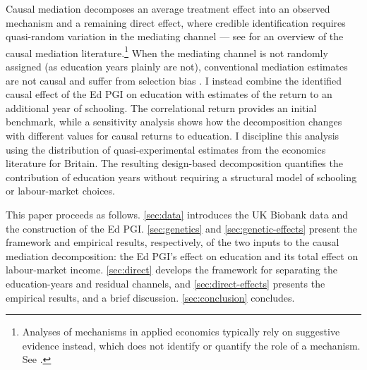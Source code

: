 Causal mediation decomposes an average treatment effect into an observed mechanism and a remaining direct effect, where credible identification requires quasi-random variation in the mediating channel \citep{imai2010identification} --- see \cite{huber2019review} for an overview of the causal mediation literature.\footnote{
    Analyses of mechanisms in applied economics typically rely on suggestive evidence instead, which does not identify or quantify the role of a mechanism.
    See \cite{blackwell2024assumption,green2010enough}.
}
When the mediating channel is not randomly assigned (as education years plainly are not), conventional mediation estimates are not causal and suffer from selection bias \citep{mediation-natural-experiment}.
I instead combine the identified causal effect of the Ed PGI on education with estimates of the return to an additional year of schooling.
The correlational return provides an initial benchmark, while a sensitivity analysis shows how the decomposition changes with different values for causal returns to education.
I discipline this analysis using the distribution of quasi-experimental estimates from the economics literature for Britain.
The resulting design-based decomposition quantifies the contribution of education years without requiring a structural model of schooling or labour-market choices.

This paper proceeds as follows.
\autoref{sec:data} introduces the UK Biobank data and the construction of the Ed PGI.
\autoref{sec:genetics} and \autoref{sec:genetic-effects} present the framework and empirical results, respectively, of the two inputs to the causal mediation decomposition: the Ed PGI's effect on education and its total effect on labour-market income.
\autoref{sec:direct} develops the framework for separating the education-years and residual channels, and \autoref{sec:direct-effects} presents the empirical results, and a brief discussion.
\autoref{sec:conclusion} concludes.
